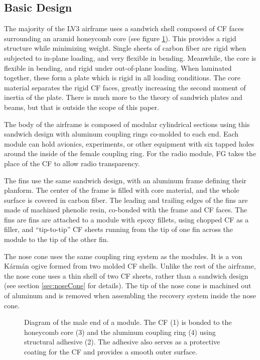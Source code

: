 \documentclass{aiaa-tc}%
\begin{document}
\subsection{Basic Design}

The majority of the LV3 airframe uses a sandwich shell composed of CF faces surrounding an aramid honeycomb core (see figure \ref{fig:moduleDiagram}). This provides a rigid structure while minimizing weight. 
Single sheets of carbon fiber are rigid when subjected to in-plane loading, and very flexible in bending. Meanwhile, the core is flexible in bending, and rigid under out-of-plane loading. 
When laminated together, these form a plate which is rigid in all loading conditions. The core material separates the rigid CF faces, greatly increasing the second moment of inertia of the plate. 
There is much more to the theory of sandwich plates and beams, but that is outside the scope of this paper. 

The body of the airframe is composed of modular cylindrical sections using this sandwich design with aluminum coupling rings co-molded to each end.
Each module can hold avionics, experiments, or other equipment with six tapped holes around the inside of the female coupling ring. 
For the radio module, FG takes the place of the CF to allow radio transparency.

The fins use the same sandwich design, with an aluminum frame defining their planform. The center of the frame is filled with core material, and the whole surface is covered in carbon fiber. 
The leading and trailing edges of the fins are made of machined phenolic resin, co-bonded with the frame and CF faces. 
The fins are fins are attached to a module with epoxy fillets, using chopped CF as a filler, and ``tip-to-tip'' CF sheets running from the tip of one fin across the module to the tip of the other fin.

The nose cone uses the same coupling ring system as the modules. It is a von K\'arm\'an ogive formed from two molded CF shells. 
Unlike the rest of the airframe, the nose cone uses a thin shell of two CF sheets, rather than a sandwich design (see section \ref{sec:noseCone} for details). 
The tip of the nose cone is machined out of aluminum and is removed when assembling the recovery system inside the nose cone. 

\begin{figure}
\centering
\def\svgwidth{\linewidth}

\caption{Diagram of the male end of a module. The CF (1) is bonded to the honeycomb core (3) and the aluminum coupling ring (4) using structural adhesive (2). The adhesive also serves as a protective coating for the CF and provides a smooth outer surface.}
\label{fig:moduleDiagram}
\end{figure}
\end{document}
